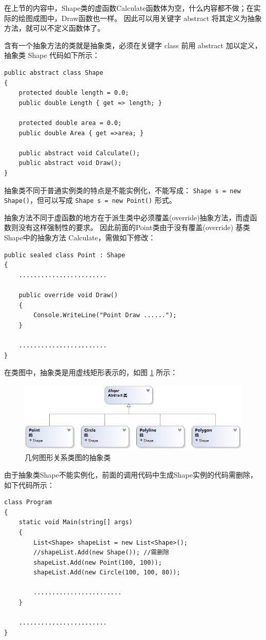 在上节的内容中，Shape类的虚函数Calculate函数体为空，什么内容都不做；在实际的绘图成图中，Draw函数也一样。
因此可以用关键字 abstract 将其定义为抽象方法，就可以不定义函数体了。

含有一个抽象方法的类就是抽象类，必须在关键字 class 前用 abstract 加以定义，抽象类 Shape 代码如下所示：

\begin{lstlisting}
public abstract class Shape
{
	protected double length = 0.0;
	public double Length { get => length; }
	
	protected double area = 0.0;
	public double Area { get =>area; }
	
	public abstract void Calculate();
	public abstract void Draw();
}
\end{lstlisting}

抽象类不同于普通实例类的特点是不能实例化，不能写成： \verb|Shape s = new Shape()|，但可以写成
\verb|Shape s = new Point()| 形式。

抽象方法不同于虚函数的地方在于派生类中必须覆盖(override)抽象方法，而虚函数则没有这样强制性的要求。
因此前面的Point类由于没有覆盖(override) 基类Shape中的抽象方法 Calculate，需做如下修改：

\begin{lstlisting}
public sealed class Point : Shape
{      
	........................
	
	public override void Draw()
	{
		Console.WriteLine("Point Draw ......");
	}
	
	........................
}
\end{lstlisting}


在类图中，抽象类是用虚线矩形表示的，如图 \ref{fig:agraph} 所示：
\begin{figure}[htbp]
	\centering
	\includegraphics[scale=0.6]{chapter/csobject/agraph.png}
	\caption{几何图形关系类图的抽象类}
	\label{fig:agraph}
\end{figure}

由于抽象类Shape不能实例化，前面的调用代码中生成Shape实例的代码需删除，如下代码所示：
\begin{lstlisting}
class Program
{
	static void Main(string[] args)
	{		
		List<Shape> shapeList = new List<Shape>();
		//shapeList.Add(new Shape()); //需删除
		shapeList.Add(new Point(100, 100));
		shapeList.Add(new Circle(100, 100, 80));
		
		........................
	}
	
	........................
}
\end{lstlisting}




